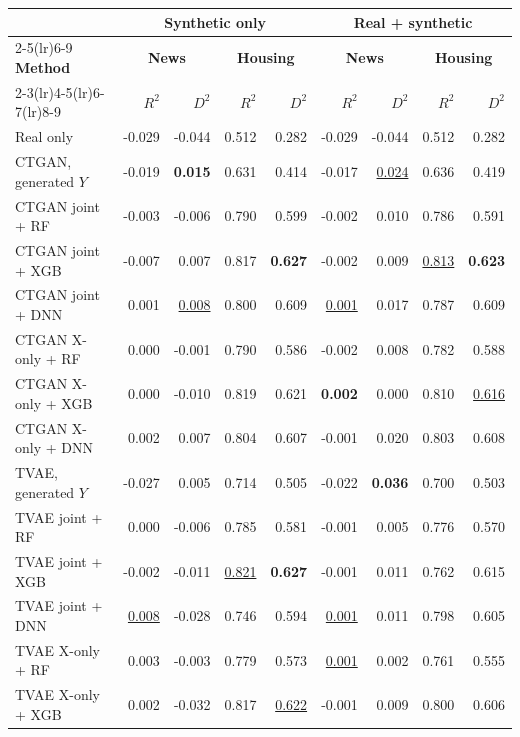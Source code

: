 \begin{table}[p]
\centering
\small
\setlength{\tabcolsep}{6pt}
\begin{tabular}{@{}lrrrrrrrr@{}}
\toprule
 & \multicolumn{4}{c}{\textbf{Synthetic only}} & \multicolumn{4}{c}{\textbf{Real + synthetic}} \\
\cmidrule(lr){2-5}\cmidrule(lr){6-9}
\textbf{Method} & \multicolumn{2}{c}{\textbf{News}} & \multicolumn{2}{c}{\textbf{Housing}} & \multicolumn{2}{c}{\textbf{News}} & \multicolumn{2}{c}{\textbf{Housing}} \\
\cmidrule(lr){2-3}\cmidrule(lr){4-5}\cmidrule(lr){6-7}\cmidrule(lr){8-9}
 & $R^2$ & $D^2$ & $R^2$ & $D^2$ & $R^2$ & $D^2$ & $R^2$ & $D^2$ \\
\midrule
Real only & -0.029 & -0.044 & 0.512 & 0.282 & -0.029 & -0.044 & 0.512 & 0.282 \\
\midrule
CTGAN, generated $Y$ & -0.019 & \textbf{0.015} & 0.631 & 0.414 & -0.017 & \underline{0.024} & 0.636 & 0.419 \\
CTGAN joint + RF & -0.003 & -0.006 & 0.790 & 0.599 & -0.002 & 0.010 & 0.786 & 0.591 \\
CTGAN joint + XGB & -0.007 & 0.007 & 0.817 & \textbf{0.627} & -0.002 & 0.009 & \underline{0.813} & \textbf{0.623} \\
CTGAN joint + DNN & 0.001 & \underline{0.008} & 0.800 & 0.609 & \underline{0.001} & 0.017 & 0.787 & 0.609 \\
CTGAN X-only + RF & 0.000 & -0.001 & 0.790 & 0.586 & -0.002 & 0.008 & 0.782 & 0.588 \\
CTGAN X-only + XGB & 0.000 & -0.010 & 0.819 & 0.621 & \textbf{0.002} & 0.000 & 0.810 & \underline{0.616} \\
CTGAN X-only + DNN & 0.002 & 0.007 & 0.804 & 0.607 & -0.001 & 0.020 & 0.803 & 0.608 \\
\addlinespace
TVAE, generated $Y$ & -0.027 & 0.005 & 0.714 & 0.505 & -0.022 & \textbf{0.036} & 0.700 & 0.503 \\
TVAE joint + RF & 0.000 & -0.006 & 0.785 & 0.581 & -0.001 & 0.005 & 0.776 & 0.570 \\
TVAE joint + XGB & -0.002 & -0.011 & \underline{0.821} & \textbf{0.627} & -0.001 & 0.011 & 0.762 & 0.615 \\
TVAE joint + DNN & \underline{0.008} & -0.028 & 0.746 & 0.594 & \underline{0.001} & 0.011 & 0.798 & 0.605 \\
TVAE X-only + RF & 0.003 & -0.003 & 0.779 & 0.573 & \underline{0.001} & 0.002 & 0.761 & 0.555 \\
TVAE X-only + XGB & 0.002 & -0.032 & 0.817 & \underline{0.622} & -0.001 & 0.009 & 0.800 & 0.606 \\

\end{tabular}
\end{table}
